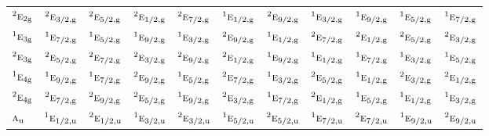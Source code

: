 \documentclass[10pt,a4paper]{article}
\numberwithin{equation}{section}
\newcommand{\irr}[1]{\text{\normalfont\scshape #1}}
\newcommand{\conjpair}[1]{{}^{#1}}
\newcommand{\ptag}[1]{\mathrm{#1}}
\begin{document}
{\begin{longtable}{@{}lcccccccccc@{}}
$\conjpair{2}\irr{e}_{2\ptag{g}}$ & $\conjpair{2}\irr{e}_{3/2,\ptag{g}}$ & $\conjpair{2}\irr{e}_{5/2,\ptag{g}}$ & $\conjpair{2}\irr{e}_{1/2,\ptag{g}}$ & $\conjpair{2}\irr{e}_{7/2,\ptag{g}}$ & $\conjpair{1}\irr{e}_{1/2,\ptag{g}}$ & $\conjpair{2}\irr{e}_{9/2,\ptag{g}}$ & $\conjpair{1}\irr{e}_{3/2,\ptag{g}}$ & $\conjpair{1}\irr{e}_{9/2,\ptag{g}}$ & $\conjpair{1}\irr{e}_{5/2,\ptag{g}}$ & $\conjpair{1}\irr{e}_{7/2,\ptag{g}}$\\
$\conjpair{1}\irr{e}_{3\ptag{g}}$ & $\conjpair{1}\irr{e}_{7/2,\ptag{g}}$ & $\conjpair{1}\irr{e}_{5/2,\ptag{g}}$ & $\conjpair{1}\irr{e}_{9/2,\ptag{g}}$ & $\conjpair{1}\irr{e}_{3/2,\ptag{g}}$ & $\conjpair{2}\irr{e}_{9/2,\ptag{g}}$ & $\conjpair{1}\irr{e}_{1/2,\ptag{g}}$ & $\conjpair{2}\irr{e}_{7/2,\ptag{g}}$ & $\conjpair{2}\irr{e}_{1/2,\ptag{g}}$ & $\conjpair{2}\irr{e}_{5/2,\ptag{g}}$ & $\conjpair{2}\irr{e}_{3/2,\ptag{g}}$\\
$\conjpair{2}\irr{e}_{3\ptag{g}}$ & $\conjpair{2}\irr{e}_{5/2,\ptag{g}}$ & $\conjpair{2}\irr{e}_{7/2,\ptag{g}}$ & $\conjpair{2}\irr{e}_{3/2,\ptag{g}}$ & $\conjpair{2}\irr{e}_{9/2,\ptag{g}}$ & $\conjpair{2}\irr{e}_{1/2,\ptag{g}}$ & $\conjpair{1}\irr{e}_{9/2,\ptag{g}}$ & $\conjpair{1}\irr{e}_{1/2,\ptag{g}}$ & $\conjpair{1}\irr{e}_{7/2,\ptag{g}}$ & $\conjpair{1}\irr{e}_{3/2,\ptag{g}}$ & $\conjpair{1}\irr{e}_{5/2,\ptag{g}}$\\
$\conjpair{1}\irr{e}_{4\ptag{g}}$ & $\conjpair{1}\irr{e}_{9/2,\ptag{g}}$ & $\conjpair{1}\irr{e}_{7/2,\ptag{g}}$ & $\conjpair{2}\irr{e}_{9/2,\ptag{g}}$ & $\conjpair{1}\irr{e}_{5/2,\ptag{g}}$ & $\conjpair{2}\irr{e}_{7/2,\ptag{g}}$ & $\conjpair{1}\irr{e}_{3/2,\ptag{g}}$ & $\conjpair{2}\irr{e}_{5/2,\ptag{g}}$ & $\conjpair{1}\irr{e}_{1/2,\ptag{g}}$ & $\conjpair{2}\irr{e}_{3/2,\ptag{g}}$ & $\conjpair{2}\irr{e}_{1/2,\ptag{g}}$\\
$\conjpair{2}\irr{e}_{4\ptag{g}}$ & $\conjpair{2}\irr{e}_{7/2,\ptag{g}}$ & $\conjpair{2}\irr{e}_{9/2,\ptag{g}}$ & $\conjpair{2}\irr{e}_{5/2,\ptag{g}}$ & $\conjpair{1}\irr{e}_{9/2,\ptag{g}}$ & $\conjpair{2}\irr{e}_{3/2,\ptag{g}}$ & $\conjpair{1}\irr{e}_{7/2,\ptag{g}}$ & $\conjpair{2}\irr{e}_{1/2,\ptag{g}}$ & $\conjpair{1}\irr{e}_{5/2,\ptag{g}}$ & $\conjpair{1}\irr{e}_{1/2,\ptag{g}}$ & $\conjpair{1}\irr{e}_{3/2,\ptag{g}}$\\
$\irr{a}_{\ptag{u}}$ & $\conjpair{1}\irr{e}_{1/2,\ptag{u}}$ & $\conjpair{2}\irr{e}_{1/2,\ptag{u}}$ & $\conjpair{1}\irr{e}_{3/2,\ptag{u}}$ & $\conjpair{2}\irr{e}_{3/2,\ptag{u}}$ & $\conjpair{1}\irr{e}_{5/2,\ptag{u}}$ & $\conjpair{2}\irr{e}_{5/2,\ptag{u}}$ & $\conjpair{1}\irr{e}_{7/2,\ptag{u}}$ & $\conjpair{2}\irr{e}_{7/2,\ptag{u}}$ & $\conjpair{1}\irr{e}_{9/2,\ptag{u}}$ & $\conjpair{2}\irr{e}_{9/2,\ptag{u}}$\\

\end{longtable}}
\end{document}
